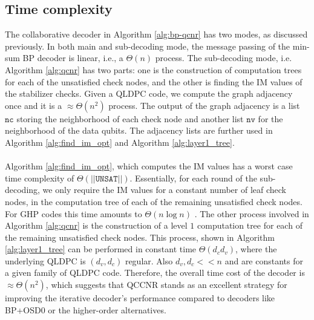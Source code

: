 \documentclass[%
 reprint,
 amsmath,amssymb,
 aps,
pra,
showkeys,
]{revtex4-2}
\begin{document}
\subsection{Time complexity}
The collaborative decoder in Algorithm \ref{alg:bp-qcnr} has two modes, as discussed previously.
In both main and sub-decoding mode, the message passing of the min-sum BP decoder is linear, i.e., a $\Theta(n)$ process.
The sub-decoding mode, i.e. Algorithm \ref{alg:qcnr} has two parts: one is the construction of computation trees for each of the unsatisfied check nodes, and the other is finding the IM values of the stabilizer checks.
Given a QLDPC code, we compute the graph adjacency once and it is a $\approx\Theta(n^2)$ process.
The output of the graph adjacency is a list $\mathtt{nc}$ storing the neighborhood of each check node and another list $\mathtt{nv}$ for the neighborhood of the data qubits.
The adjacency lists are further used in Algorithm \ref{alg:find_im_opt} and Algorithm \ref{alg:layer1_tree}.\\\\
Algorithm \ref{alg:find_im_opt}, which computes the IM values has a worst case time complexity of $\Theta(||\mathtt{UNSAT}||)$.
Essentially, for each round of the sub-decoding, we only require the IM values for a constant number of leaf check nodes, in the computation tree of each of the remaining unsatisfied check nodes.
For GHP codes this time amounts to $\Theta(n\log{n})$ \cite{panteleev2021quantum}.
The other process involved in Algorithm \ref{alg:qcnr} is the construction of a level $1$ computation tree for each of the remaining unsatisfied check nodes.
This process, shown in Algorithm \ref{alg:layer1_tree} can be performed in constant time $\Theta(d_cd_v)$, where the underlying QLDPC is $(d_v,d_c)$ regular.
Also $d_v, d_c << n$ and are constants for a given family of QLDPC code.
Therefore, the overall time cost of the decoder is $\approx \Theta(n^2)$, which suggests that QCCNR stands as an excellent strategy for improving the iterative decoder's performance compared to decoders like BP+OSD0 or the higher-order alternatives.
\end{document}

